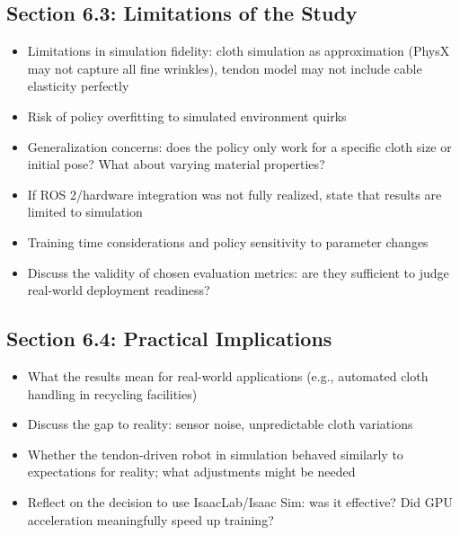 \subsection{Section 6.3: Limitations of the Study}
\begin{itemize}
    \item Limitations in simulation fidelity: cloth simulation as approximation (PhysX may not capture all fine wrinkles), tendon model may not include cable elasticity perfectly
    \item Risk of policy overfitting to simulated environment quirks
    \item Generalization concerns: does the policy only work for a specific cloth size or initial pose? What about varying material properties?
    \item If ROS 2/hardware integration was not fully realized, state that results are limited to simulation
    \item Training time considerations and policy sensitivity to parameter changes
    \item Discuss the validity of chosen evaluation metrics: are they sufficient to judge real-world deployment readiness?
\end{itemize}

\subsection{Section 6.4: Practical Implications}
\begin{itemize}
    \item What the results mean for real-world applications (e.g., automated cloth handling in recycling facilities)
    \item Discuss the gap to reality: sensor noise, unpredictable cloth variations
    \item Whether the tendon-driven robot in simulation behaved similarly to expectations for reality; what adjustments might be needed
    \item Reflect on the decision to use IsaacLab/Isaac Sim: was it effective? Did GPU acceleration meaningfully speed up training?
\end{itemize}

